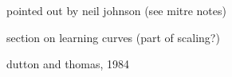pointed out by neil johnson (see mitre notes)

section on learning curves
(part of scaling?)

dutton and thomas, 1984


\begin{frame}
  \frametitle{}

\end{frame}


